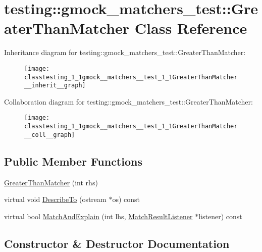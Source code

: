 \hypertarget{classtesting_1_1gmock__matchers__test_1_1GreaterThanMatcher}{}\section{testing\+:\+:gmock\+\_\+matchers\+\_\+test\+:\+:Greater\+Than\+Matcher Class Reference}
\label{classtesting_1_1gmock__matchers__test_1_1GreaterThanMatcher}


Inheritance diagram for testing\+:\+:gmock\+\_\+matchers\+\_\+test\+:\+:Greater\+Than\+Matcher\+:\nopagebreak
\begin{figure}[H]
\begin{center}
\leavevmode
\texttt{[image: classtesting\_1\_1gmock\_\_matchers\_\_test\_1\_1GreaterThanMatcher\_\_inherit\_\_graph]}
\end{center}
\end{figure}


Collaboration diagram for testing\+:\+:gmock\+\_\+matchers\+\_\+test\+:\+:Greater\+Than\+Matcher\+:\nopagebreak
\begin{figure}[H]
\begin{center}
\leavevmode
\texttt{[image: classtesting\_1\_1gmock\_\_matchers\_\_test\_1\_1GreaterThanMatcher\_\_coll\_\_graph]}
\end{center}
\end{figure}
\subsection*{Public Member Functions}
\begin{DoxyCompactItemize}
\item 
\hyperlink{classtesting_1_1gmock__matchers__test_1_1GreaterThanMatcher_a605c50137599a1dba0701bbd735bf1e8}{Greater\+Than\+Matcher} (int rhs)
\item 
virtual void \hyperlink{classtesting_1_1gmock__matchers__test_1_1GreaterThanMatcher_a92cf6ff96d14a4c183961ae3ce848f37}{Describe\+To} (ostream $\ast$os) const 
\item 
virtual bool \hyperlink{classtesting_1_1gmock__matchers__test_1_1GreaterThanMatcher_a2e7f2d786f9e202f40ea3317f29261db}{Match\+And\+Explain} (int lhs, \hyperlink{classtesting_1_1MatchResultListener}{Match\+Result\+Listener} $\ast$listener) const 
\end{DoxyCompactItemize}


\subsection{Constructor \& Destructor Documentation}
